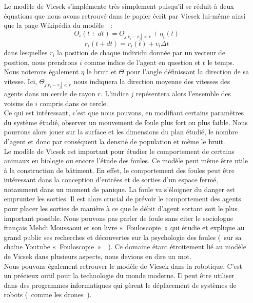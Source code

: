 \documentclass[french, a4paper, 12pt]{article}
\begin{document}
	Le modèle de Vicsek s'implémente très simplement puisqu'il se réduit à deux équations que nous avons retrouvé dans le papier écrit par Vicsek lui-même ainsi que la page Wikipédia du modèle~\cite{vicsek-paper, wiki-model}~:
	\[
		\Theta_{i}(t+dt) = \Theta_{j |r_{i}-r_{j}|<r} + \eta_{i}(t)
	\]
	\[
		r_{i}(t+dt) = r_{i}(t) + v_{i}\Delta t
	\]
	dans lesquelles $r_{i}$ la position de chaque individu donnée par un vecteur de position, nous prendrons $i$ comme indice de l'agent en question et $t$ le temps. Nous noterons également $\eta$ le bruit et $\Theta$ pour l’angle définissant la direction de sa vitesse. Ici, $\Theta_{j |r_{i}-r_{j}|<r}$ nous indiquera la direction moyenne des vitesses des agents dans un cercle de rayon $r$. L'indice $j$ repésentera alors l'ensemble des voisins de $i$ compris dans ce cercle.\\

	Ce qui est intéressant, c'est que nous pouvons, en modifiant certains paramètres du système étudié, observer un mouvement de foule plus fort ou plus faible. Nous pourrons alors jouer sur la surface et les dimensions du plan étudié, le nombre d'agent et donc par conséquent la densité de population et même le bruit.\\

	Le modèle de Vicsek est important pour étudier le comportement de certains animaux en biologie ou encore l'étude des foules. Ce modèle peut même être utile à la construction de bâtiment. En effet, le comportement des foules peut être intéressant dans la conception d'entrées et de sorties d'un espace fermé, notamment dans un moment de panique. La foule va s'éloigner du danger est emprunter les sorties. Il est alors crucial de prévoir le comportement des agents pour placer les sorties de manière à ce que le débit d'agent sortant soit le plus important possible. Nous pouvons pas parler de foule sans citer le sociologue français Mehdi Moussaoui et son livre «~Fouloscopie~» qui étudie et explique au grand public ses recherches et découvertes sur la psychologie des foules (~sur sa chaîne Youtube «~Fouloscopie~»~\cite{fouloscopie}~). Ce domaine étant étroitement lié au modèle de Vicsek dans plusieurs aspects, nous devions en dire un mot. \\

	Nous pouvons également retrouver le modèle de Vicsek dans la robotique. C'est un précieux outil pour la technologie du monde moderne. Il peut être utiliser dans des programmes informatiques qui gèrent le déplacement de systèmes de robots (~comme les drones~).\\ 
\end{document}
